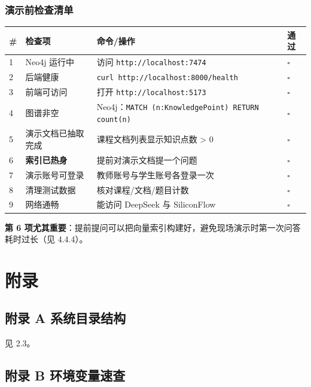 \documentclass[UTF8,a4paper,11pt]{ctexrep}
\begin{document}
\subsection{演示前检查清单}

\begin{center}
\small
\begin{tabularx}{\linewidth}{@{}XXXX@{}}
\toprule
\# & 检查项 & 命令/操作 & 通过 \\
\midrule
1 & Neo4j 运行中 & 访问 \texttt{http://localhost:7474} & $\square$ \\
2 & 后端健康 & \texttt{curl http://localhost:8000/health} & $\square$ \\
3 & 前端可访问 & 打开 \texttt{http://localhost:5173} & $\square$ \\
4 & 图谱非空 & Neo4j：\texttt{MATCH (n:KnowledgePoint) RETURN count(n)} & $\square$ \\
5 & 演示文档已抽取完成 & 课程文档列表显示知识点数 > 0 & $\square$ \\
6 & \textbf{索引已热身} & 提前对演示文档提一个问题 & $\square$ \\
7 & 演示账号可登录 & 教师账号与学生账号各登录一次 & $\square$ \\
8 & 清理测试数据 & 核对课程/文档/题目计数 & $\square$ \\
9 & 网络通畅 & 能访问 DeepSeek 与 SiliconFlow & $\square$ \\
\bottomrule
\end{tabularx}
\end{center}
\begin{notebox}
\textbf{第 6 项尤其重要}：提前提问可以把向量索引构建好，避免现场演示时第一次问答耗时过长（见 4.4.4）。

\end{notebox}


\chapter*{附录}


\section*{附录 A 系统目录结构}

见 2.3。


\section*{附录 B 环境变量速查}
\end{document}
